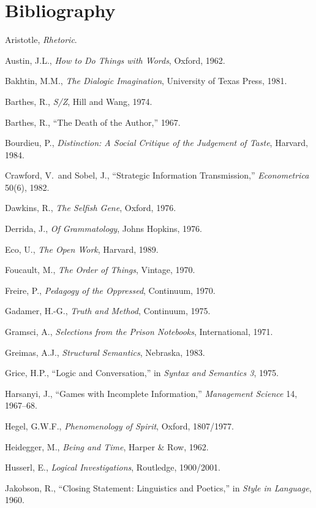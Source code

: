 \documentclass[11pt,oneside]{book}
\theoremstyle{plain}
\theoremstyle{definition}
\theoremstyle{remark}
\begin{document}
\chapter*{Bibliography}

\begin{enumerate}[label={[\arabic*]}]
\item Aristotle, \emph{Rhetoric}.
\item Austin, J.L., \emph{How to Do Things with Words}, Oxford, 1962.
\item Bakhtin, M.M., \emph{The Dialogic Imagination}, University of Texas Press, 1981.
\item Barthes, R., \emph{S/Z}, Hill and Wang, 1974.
\item Barthes, R., ``The Death of the Author,'' 1967.
\item Bourdieu, P., \emph{Distinction: A Social Critique of the Judgement of Taste}, Harvard, 1984.
\item Crawford, V.\ and Sobel, J., ``Strategic Information Transmission,''
\emph{Econometrica} 50(6), 1982.
\item Dawkins, R., \emph{The Selfish Gene}, Oxford, 1976.
\item Derrida, J., \emph{Of Grammatology}, Johns Hopkins, 1976.
\item Eco, U., \emph{The Open Work}, Harvard, 1989.
\item Foucault, M., \emph{The Order of Things}, Vintage, 1970.
\item Freire, P., \emph{Pedagogy of the Oppressed}, Continuum, 1970.
\item Gadamer, H.-G., \emph{Truth and Method}, Continuum, 1975.
\item Gramsci, A., \emph{Selections from the Prison Notebooks}, International, 1971.
\item Greimas, A.J., \emph{Structural Semantics}, Nebraska, 1983.
\item Grice, H.P., ``Logic and Conversation,'' in \emph{Syntax and Semantics 3}, 1975.
\item Harsanyi, J., ``Games with Incomplete Information,'' \emph{Management Science} 14, 1967--68.
\item Hegel, G.W.F., \emph{Phenomenology of Spirit}, Oxford, 1807/1977.
\item Heidegger, M., \emph{Being and Time}, Harper \& Row, 1962.
\item Husserl, E., \emph{Logical Investigations}, Routledge, 1900/2001.
\item Jakobson, R., ``Closing Statement: Linguistics and Poetics,'' in \emph{Style in Language}, 1960.

\end{enumerate}
\end{document}
